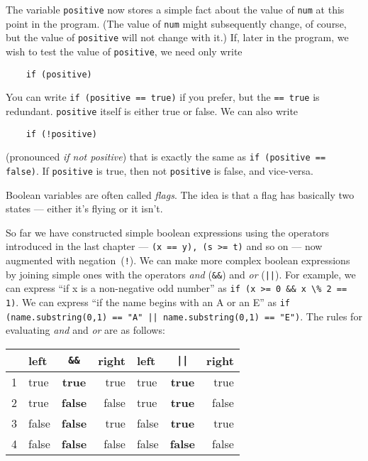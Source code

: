 The variable \texttt{positive} now stores a simple fact about the value of
 \texttt{num} at this point in the program.  (The value of  \texttt{num} might
subsequently change, of course, but the value of \texttt{positive} will not
change with it.)  If, later in the program, we wish to test
the value of \texttt{positive}, we need only write

\begin{Verbatim}
    if (positive)
\end{Verbatim}

You can write \texttt{if (positive == true)} if you prefer, but the
\texttt{== true} 
is redundant.  \texttt{positive} itself is either true or false.  
We can also write

\begin{Verbatim}
    if (!positive)
\end{Verbatim}

(pronounced \emph{if not positive}) that is exactly the same as \texttt{if
  (positive == false)}. If \texttt{positive} is true, then not
\texttt{positive} is false, and vice-versa. 

Boolean variables are often called \emph{flags}.  The idea is that
a flag has basically two states
--- either it's flying or it isn't.

So far we have constructed simple boolean expressions using the operators
introduced in the last chapter --- \texttt{(x == y), (s >= t)} and so on ---
now augmented with negation~(\verb+!+).
We can make more complex boolean expressions by joining simple ones
with the operators \emph{and} (\verb!&&!) and \emph{or} (\texttt{||}).  For example,
we can express ``if x is a non-negative odd number'' as
\verb+if (x >= 0 && x \% 2 == 1)+. We can express ``if the name begins
with an A or an E'' as \texttt{if (name.substring(0,1) == "A" ||
  name.substring(0,1) == "E")}.  The rules for evaluating \emph{and}
and \emph{or} are as follows:

\vspace{1em}
\begin{tabular}{|l|lcr||lcr|}
\hline
& left & \verb!&&! & right & left & \verb+||+ & right\\
\hline
\hline
1 & true & \textbf{true} & true&true&\textbf{true}&true\\
2 & true & \textbf{false} & false&true&\textbf{true}&false\\
3 & false & \textbf{false} & true&false&\textbf{true}&true\\
4 & false & \textbf{false} & false&false&\textbf{false}&false\\
\hline
\end{tabular}
\vspace{1em}

